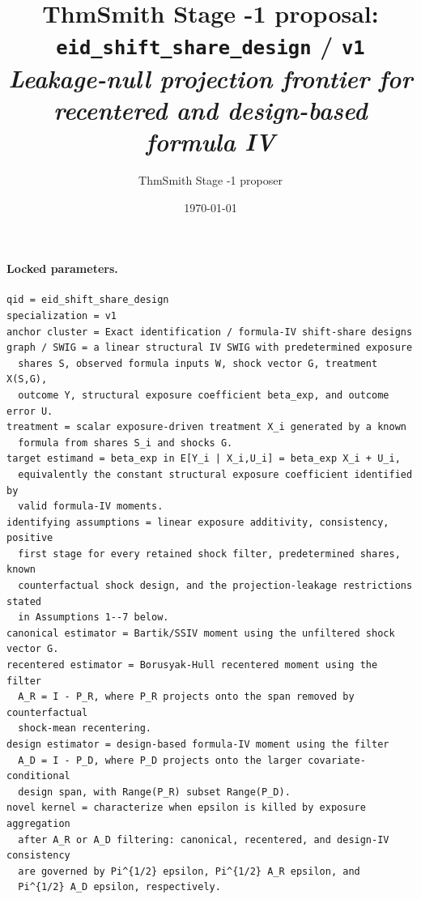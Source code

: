 \documentclass[11pt]{article}
\title{ThmSmith Stage -1 proposal: \texttt{eid\_shift\_share\_design} / \texttt{v1}%
  \\ \large\textit{Leakage-null projection frontier for recentered and design-based formula IV}}
\author{ThmSmith Stage -1 proposer}
\date{\today}
\theoremstyle{definition}
\theoremstyle{plain}
\theoremstyle{remark}
\begin{document}
\maketitle


\paragraph{Locked parameters.}
\begin{verbatim}
qid = eid_shift_share_design
specialization = v1
anchor cluster = Exact identification / formula-IV shift-share designs
graph / SWIG = a linear structural IV SWIG with predetermined exposure
  shares S, observed formula inputs W, shock vector G, treatment X(S,G),
  outcome Y, structural exposure coefficient beta_exp, and outcome error U.
treatment = scalar exposure-driven treatment X_i generated by a known
  formula from shares S_i and shocks G.
target estimand = beta_exp in E[Y_i | X_i,U_i] = beta_exp X_i + U_i,
  equivalently the constant structural exposure coefficient identified by
  valid formula-IV moments.
identifying assumptions = linear exposure additivity, consistency, positive
  first stage for every retained shock filter, predetermined shares, known
  counterfactual shock design, and the projection-leakage restrictions stated
  in Assumptions 1--7 below.
canonical estimator = Bartik/SSIV moment using the unfiltered shock vector G.
recentered estimator = Borusyak-Hull recentered moment using the filter
  A_R = I - P_R, where P_R projects onto the span removed by counterfactual
  shock-mean recentering.
design estimator = design-based formula-IV moment using the filter
  A_D = I - P_D, where P_D projects onto the larger covariate-conditional
  design span, with Range(P_R) subset Range(P_D).
novel kernel = characterize when epsilon is killed by exposure aggregation
  after A_R or A_D filtering: canonical, recentered, and design-IV consistency
  are governed by Pi^{1/2} epsilon, Pi^{1/2} A_R epsilon, and
  Pi^{1/2} A_D epsilon, respectively.
\end{verbatim}
\end{document}
